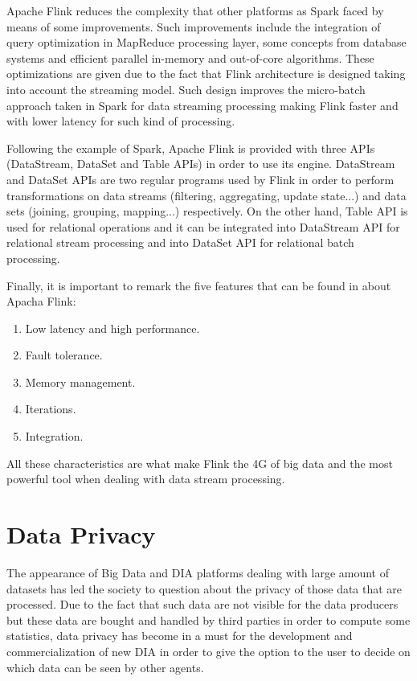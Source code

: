 Apache Flink reduces the complexity that other platforms as Spark faced by means of some improvements. Such improvements include the integration of query optimization in MapReduce processing layer, some concepts from database systems and efficient parallel in-memory and out-of-core algorithms. These optimizations are given due to the fact that Flink architecture is designed taking into account the streaming model. Such design improves the micro-batch approach taken in Spark for data streaming processing making Flink faster and with lower latency for such kind of processing.

Following the example of Spark, Apache Flink is provided with three APIs (DataStream, DataSet and Table APIs) in order to use its engine. DataStream and DataSet APIs are two regular programs used by Flink in order to perform transformations on data streams (filtering, aggregating, update state...) and data sets (joining, grouping, mapping...) respectively. On the other hand, Table API is used for relational operations and it can be integrated into DataStream API for relational stream processing and into DataSet API for relational batch processing.

Finally, it is important to remark the five features that can be found in \cite{flinkwebsite} about Apacha Flink:

\begin{enumerate}

\item Low latency and high performance.
\item Fault tolerance.
\item Memory management.
\item Iterations.
\item Integration.

\end{enumerate}

All these characteristics are what make Flink the 4G of big data and the most powerful tool when dealing with data stream processing.

\section{Data Privacy}
\label{Data Privacy}

The appearance of Big Data and DIA platforms dealing with large amount of datasets has led the society to question about the privacy of those data that are processed. Due to the fact that such data are not visible for the data producers but these data are bought and handled by third parties in order to compute some statistics, data privacy has become in a must for the development and commercialization of new DIA in order to give the option to the user to decide on which data can be seen by other agents.


